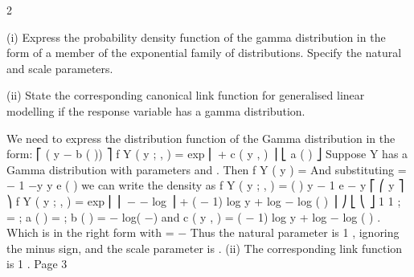 

2 \item (i)  Express the probability density function of the gamma distribution in the form
of a member of the exponential family of distributions. Specify the natural
and scale parameters.

\item (ii)  State the corresponding canonical link function for generalised linear
modelling if the response variable has a gamma distribution.

We need to express the distribution function of the Gamma distribution in the
form:
⎡ ( y \theta  − b ( \theta  ))
⎤
f Y ( y ; \theta  , \phi  ) = exp ⎢
+ c ( y , \phi  ) ⎥
⎣ a ( \phi  )
⎦
Suppose Y has a Gamma distribution with parameters \alpha  and \lambda  . Then
f Y ( y ) =
And substituting \lambda  =
\lambda  \alpha  \alpha − 1 −\lambda  y
y e
\Gamma  ( \alpha  )
\alpha 
we can write the density as
\mu
f Y ( y ; \theta  , \phi  ) =
\alpha  \alpha 
\mu \alpha  \Gamma  ( \alpha  )
y
\alpha − 1
e
−
y \alpha 
\mu
⎡ ⎛ y
⎤
⎞
f Y ( y ; \theta  , \phi  ) = exp ⎢ ⎜ − − log \mu ⎟ \alpha  + ( \alpha  − 1) log y + \alpha  log \alpha  − log \Gamma  ( \alpha  ) ⎥
⎠
⎣ ⎝ \mu
⎦
1
1
; \phi  = \alpha  ; a ( \phi  ) = ; b ( \theta  ) = − log( −\theta  )
\mu
\phi 
and c ( y , \phi  ) = ( \phi  − 1) log y + \phi  log \phi  − log \Gamma  ( \phi  ) .
Which is in the right form with \theta  = −
Thus the natural parameter is
1
, ignoring the minus sign, and the scale
\mu
parameter is \alpha  .
(ii)
The corresponding link function is
1
.
\mu
Page 3%
